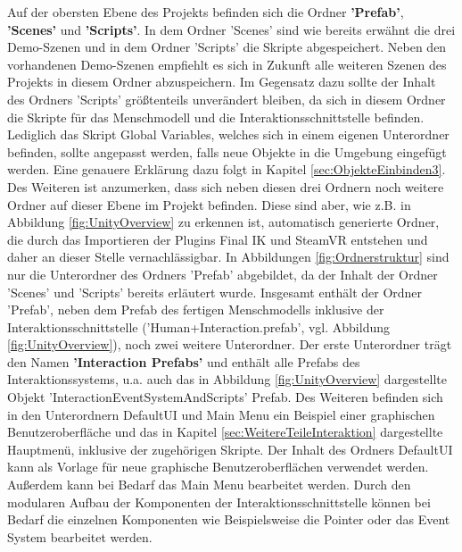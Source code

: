 Auf der obersten Ebene des Projekts befinden sich die Ordner \textbf{'Prefab'}, \textbf{'Scenes'} und \textbf{'Scripts'}. In dem Ordner 'Scenes' sind wie bereits erwähnt die drei Demo-Szenen und in dem Ordner 'Scripts' die Skripte abgespeichert. Neben den vorhandenen Demo-Szenen empfiehlt es sich in Zukunft alle weiteren Szenen des Projekts in diesem Ordner abzuspeichern. Im Gegensatz dazu sollte der Inhalt des Ordners 'Scripts' größtenteils unverändert bleiben, da sich in diesem Ordner die Skripte für das Menschmodell und die Interaktionsschnittstelle befinden. Lediglich das Skript Global Variables, welches sich in einem eigenen Unterordner befinden, sollte angepasst werden, falls neue Objekte in die Umgebung eingefügt werden. Eine genauere Erklärung dazu folgt in Kapitel \ref{sec:ObjekteEinbinden3}. Des Weiteren ist anzumerken, dass sich neben diesen drei Ordnern noch weitere Ordner auf dieser Ebene im Projekt befinden. Diese sind aber, wie z.B. in Abbildung \ref{fig:UnityOverview} zu erkennen ist, automatisch generierte Ordner, die durch das Importieren der Plugins Final IK und SteamVR entstehen und daher an dieser Stelle vernachlässigbar. 
\newline\newline
In Abbildungen \ref{fig:Ordnerstruktur} sind nur die Unterordner des Ordners 'Prefab' abgebildet, da der Inhalt der Ordner 'Scenes' und 'Scripts' bereits erläutert wurde. Insgesamt enthält der Ordner 'Prefab', neben dem Prefab des fertigen Menschmodells inklusive der Interaktionsschnittstelle ('Human+Interaction.prefab', vgl. Abbildung \ref{fig:UnityOverview}), noch zwei weitere Unterordner.
\newline
Der erste Unterordner trägt den Namen \textbf{'Interaction Prefabs'} und enthält alle Prefabs des Interaktionssystems, u.a. auch das in Abbildung \ref{fig:UnityOverview} dargestellte Objekt 'InteractionEventSystemAndScripts' Prefab. Des Weiteren befinden sich in den Unterordnern DefaultUI und Main Menu ein Beispiel einer graphischen Benutzeroberfläche und das in Kapitel \ref{sec:WeitereTeileInteraktion} dargestellte Hauptmenü, inklusive der zugehörigen Skripte. Der Inhalt des Ordners DefaultUI kann als Vorlage für neue graphische Benutzeroberflächen verwendet werden. Außerdem kann bei Bedarf das Main Menu bearbeitet werden. Durch den modularen Aufbau der Komponenten der Interaktionsschnittstelle können bei Bedarf die einzelnen Komponenten wie Beispielsweise die Pointer oder das Event System bearbeitet werden.
\newline
